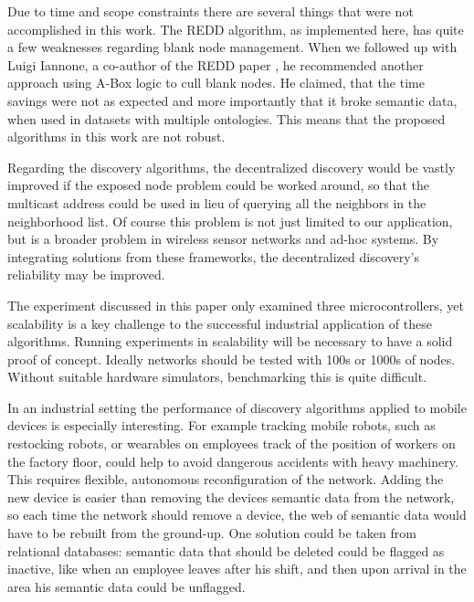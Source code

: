 Due to time and scope constraints there are several things that were not accomplished in this work. The REDD algorithm, as implemented here, has quite a few weaknesses regarding blank node management. When we followed up with Luigi Iannone, a co-author of the REDD paper \cite{Esposito.2005}, he recommended another approach using A-Box logic to cull blank nodes. He claimed, that the time savings were not as expected and more importantly that it broke semantic data, when used in datasets with multiple ontologies. This means that the proposed algorithms in this work are not robust.

Regarding the discovery algorithms, the decentralized discovery would be vastly improved if the exposed node problem could be worked around, so that the multicast address could be used in lieu of querying all the neighbors in the neighborhood list. Of course this problem is not just limited to our application, but is a broader problem in wireless sensor networks and ad-hoc systems. By integrating solutions from these frameworks, the decentralized discovery's reliability may be improved. 

The experiment discussed in this paper only examined three microcontrollers, yet scalability is a key challenge to the successful industrial application of these algorithms. Running experiments in scalability will be necessary to have a solid proof of concept. Ideally networks should be tested with 100s or 1000s of nodes. Without suitable hardware simulators, benchmarking this is quite difficult.

In an industrial setting the performance of discovery algorithms applied to mobile devices is especially interesting. For example tracking mobile robots, such as restocking robots, or wearables on employees track of the position of workers on the factory floor, could help to avoid dangerous accidents with heavy machinery. This requires flexible, autonomous reconfiguration of the network. Adding the new device is easier than removing the devices semantic data from the network, so each time the network should remove a device, the web of semantic data would have to be rebuilt from the ground-up. One solution could be taken from relational databases: semantic data that should be deleted could be flagged as inactive, like when an employee leaves after his shift, and then upon arrival in the area his semantic data could be unflagged.
